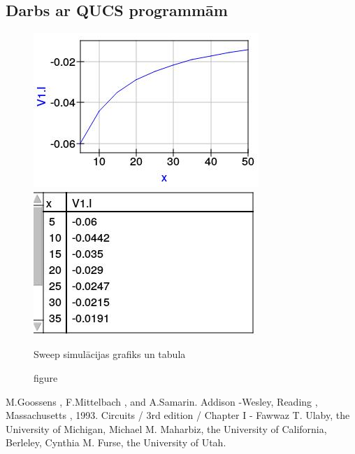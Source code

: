 \documentclass{report}
\begin{document}
\subsection{Darbs ar QUCS programmām}
\begin{figure}[ht]
  \includegraphics[width=0.5\linewidth]{grafiks.png}
  \includegraphics[width=0.5\linewidth]{tabula.png}
  \caption{figure}{Sweep simulācijas grafiks un tabula}
\end{figure}

\begin{thebibliography}{9}
M.Goossens , F.Mittelbach , and A.Samarin.
Addison -Wesley, Reading , Massachusetts , 1993.
Circuits / 3rd edition / Chapter I - Fawwaz T. Ulaby, the University of Michigan, Michael M. Maharbiz, the University of California, Berleley, Cynthia M. Furse, the University of Utah.
\end{thebibliography}
\end{document}
